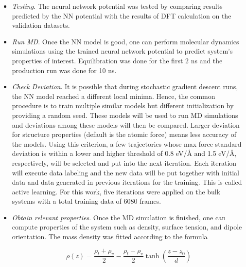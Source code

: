 \begin{itemize}
    \item \emph{Testing}. The neural network potential was tested by
          comparing results predicted by the NN potential with	  the results
          of DFT
          calculation on the validation datasets.

    \item \emph{Run MD}. Once the NN model is good, one can perform molecular
          dynamics simulations using the trained neural   network potential to
          predict
          system's properties of interest. Equilibration was done for the first 2 ns and the production run was done for 10 ns.

    \item \emph{Check Deviation}. It is possible that during stochastic
          gradient descent runs, the NN model reached a different local minima.
          Hence,
          the common procedure is to train multiple similar models but
          different
          initialization by providing a  random seed. These models will be used
          to run MD simulations and deviations among these models will then be
          compared. Larger deviation for structure properties (default is the
          atomic
          force) means less accuracy of the models. Using this criterion, a few
          trajectories whose max force standard deviation is within a lower and
          higher
          threshold of 0.8 \unit{eV/\angstrom} and 1.5	\unit{eV/\angstrom},
          respectively,
          will be selected and put into the next iteration. Each iteration will
          execute data labeling  and  the new data will be put together with
          initial data
          and data generated in previous iterations for the training. This is
          called active learning. For this work, five iterations were applied
          on
          the bulk
          systems with a total training data of 6080 frames.

    \item \emph{Obtain relevant properties}. Once the MD
          simulation is
          finished, one can compute properties of the system such as density,
          surface
          tension, and dipole orientation.	 The mass density was fitted according to the formula \cite{sanchez2023deep}

          \begin{equation}
              \rho(z) = \frac{\rho_l+\rho_v}{2} -  \frac{\rho_l-\rho_v}{2} \tanh\left(\frac{z-z_0}{d} \right)
              \label{eq:fit_dens}
          \end{equation}


\end{itemize}

